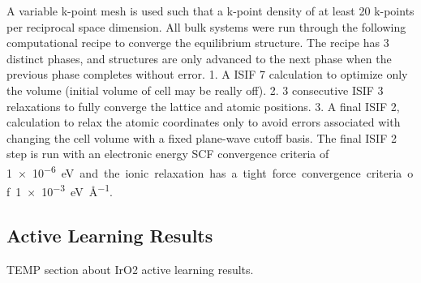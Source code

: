 %
%
A variable k-point mesh is used such that a k-point density of at least \num{20} k-points per reciprocal space dimension.
%
All bulk systems were run through the following computational recipe to converge the equilibrium structure.
%
The recipe has \num{3} distinct phases, and structures are only advanced to the next phase when the previous phase completes without error.
%
1. A ISIF \num{7} calculation to optimize only the volume (initial volume of cell may be really off).
%
2. \num{3} consecutive ISIF \num{3} relaxations to fully converge the lattice and atomic positions.
%
3. A final ISIF \num{2}, calculation to relax the atomic coordinates only to avoid errors associated with changing the cell volume with a fixed plane-wave cutoff basis.
%
The final ISIF \num{2} step is run with an electronic energy SCF convergence criteria of \SI{1e-6} eV and the ionic relaxation has a tight force convergence criteria of \SI{1e-3}{\electronvolt\per\angstrom}.




\subsection{\IrOtwo Active Learning Results} %


%
%
TEMP section about IrO2 active learning results.




